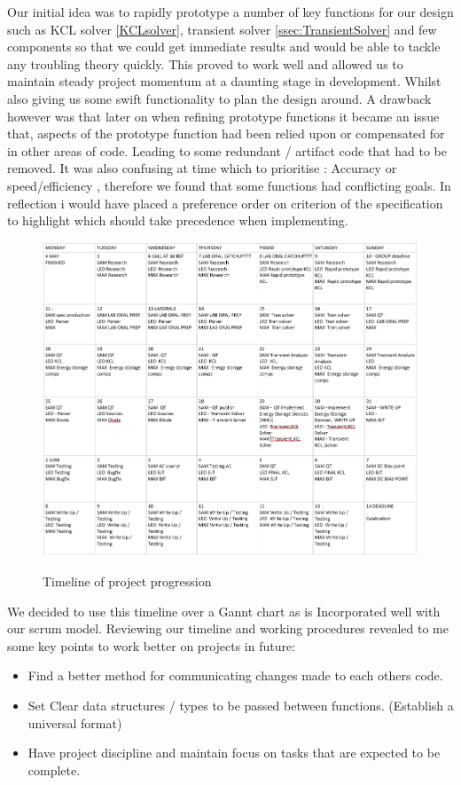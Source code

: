 \documentclass{article}
\begin{document}
Our initial idea was to rapidly prototype a number of key functions for our design such as KCL solver \ref{KCLsolver}, transient solver \ref{ssec:TransientSolver} and few components so that we could get immediate results and would be able to tackle any troubling theory quickly. This proved to work well and allowed us to maintain steady project momentum at a daunting stage in development. Whilst also giving us some swift functionality to  plan the design around.  A drawback however was that later on when refining prototype functions it became an issue that, aspects of the prototype function had been relied upon or compensated for in other areas of code. Leading to some redundant / artifact code that had to be removed.
\medbreak
It was also confusing at time which to prioritise : Accuracy or speed/efficiency , therefore we found that some functions had conflicting goals. In reflection i would have placed a preference order on criterion of the specification to highlight which should take precedence when implementing.  
\smallbreak
\begin{figure}[h]
    \caption{Timeline of project progression}
    \centering
    \includegraphics[width=0.6\linewidth]{images/Timeline.PNG}
    \label{fig:Timeline}
\end{figure}
We decided to use this timeline over a Gannt chart as is Incorporated well with our scrum model.
Reviewing our timeline and working procedures revealed to me some key points to work better on projects in future:
\begin{itemize}
    \item Find a better method for communicating changes made to each others code.
    \item Set Clear data structures / types to be passed between functions. (Establish a universal format)
    \item Have project discipline and maintain focus on tasks that are expected to be complete.
\end{itemize}
\newpage
\end{document}
